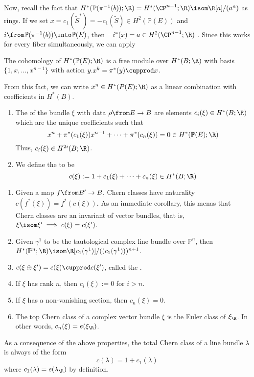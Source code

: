 \documentclass[11pt,leqno,oneside]{amsbook}
\renewcommand{\P}{\mathbb{P}}
\numberwithin{thm}{section}
\begin{document}
Now, recall the fact that \(H^*(\P(\pi^{-1}(b));\R) = H^*(\CP^{n-1};\R) \isom \R[a]/(a^{n})\) as
rings. If we set \(x = c_1(\tilde{S}^*) = -c_1(\tilde{S}) \in
H^2(\P(E))\) and \(i \from \P(\pi^{-1}(b)) \into \P(E)\), then
\(-i^*(x) = a \in H^2(\CP^{n-1};\R)\) . Since this works for every
fiber simultaneously, we can apply
\begin{cor}
  The cohomology of \(H^*(\P(E);\R)\) is a free module over \(H^*(B;\R)\) with basis
  \(\{1,x, \ldots, x^{n-1}\}\) with action \(y.x^k = \pi^* (y)
  \cupprod x\).
\end{cor}
From this fact, we can write \(x^n \in H^*(P(E);\R)\) as a linear
combination with coefficients in \(H^*(B)\).
\begin{defn}
  \begin{enumerate}
  \item The  of the bundle \(\xi\) with data
    \(\rho \from E \to B\) are elements \(c_i(\xi) \in H^*(B;\R)\)
    which are the unique coefficients such that
    \[ x^n + \pi^*(c_1(\xi)) x^{n-1} + \cdots + \pi^*(c_n(\xi)) = 0 \in
      H^*(\P(E);\R)
    \]
    Thus, \(c_i(\xi) \in H^{2i}(B;\R)\).
  \item We define the  to be \[
      c(\xi) := 1 + c_1(\xi) + \cdots + c_n(\xi) \in H^*(B;\R)
    \]
  \end{enumerate}
\end{defn}
\begin{prop}\label{chern-class-props}
  \begin{enumerate}
  \item Given a map \(f \from B' \to B\), Chern classes have
    naturality \(c(f^*(\xi)) = f^*(c(\xi))\). As an immediate
    corollary, this menas that Chern classes are an invariant of
    vector bundles, that is, \(\xi \isom \xi' \implies c(\xi) =
    c(\xi')\). 
  \item Given \(\gamma^1\) to be the tautological complex line bundle
    over \(\P^n\), then \(H^*(\P^n;\R) \isom
    \R[c_1(\gamma^1)]/((c_1(\gamma^1)))^{n+1}\).
  \item \(c(\xi \oplus \xi') = c(\xi) \cupprod c(\xi')\), called the
    .
  \item If \(\xi\) has rank \(n\), then \(c_i(\xi) := 0\) for \(i >
    n\).
  \item If \(\xi\) has a non-vanishing section, then \(c_n(\xi) = 0\).
  \item The top Chern class of a complex vector bundle \(\xi\) is the
    Euler class of \(\xi_\R\). In other words, \(c_n(\xi) =
    e(\xi_\R)\). 
  \end{enumerate}
\end{prop}
\begin{cor}\label{total-class-of-line-bundle}
  As a consequence of the above properties, the total Chern class of a
  line bundle \(\lambda\) is always of the form \[
    c(\lambda) = 1 + c_1(\lambda)
  \]
  where \(c_1(\lambda) = e(\lambda_\R)\) by definition.
\end{cor}
\end{document}
